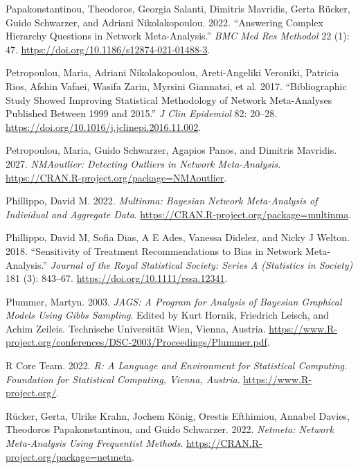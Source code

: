 \begin{CSLReferences}{1}{0}
\leavevmode{}%
Papakonstantinou, Theodoros, Georgia Salanti, Dimitris Mavridis, Gerta Rücker, Guido Schwarzer, and Adriani Nikolakopoulou. 2022. {``Answering Complex Hierarchy Questions in Network Meta-Analysis.''} \emph{BMC Med Res Methodol} 22 (1): 47. \url{https://doi.org/10.1186/s12874-021-01488-3}.

\leavevmode{}%
Petropoulou, Maria, Adriani Nikolakopoulou, Areti-Angeliki Veroniki, Patricia Rios, Afshin Vafaei, Wasifa Zarin, Myrsini Giannatsi, et al. 2017. {``Bibliographic Study Showed Improving Statistical Methodology of Network Meta-Analyses Published Between 1999 and 2015.''} \emph{J Clin Epidemiol} 82: 20--28. \url{https://doi.org/10.1016/j.jclinepi.2016.11.002}.

\leavevmode{}%
Petropoulou, Maria, Guido Schwarzer, Agapios Panos, and Dimitris Mavridis. 2027. \emph{NMAoutlier: Detecting Outliers in Network Meta-Analysis}. \url{https://CRAN.R-project.org/package=NMAoutlier}.

\leavevmode{}%
Phillippo, David M. 2022. \emph{Multinma: Bayesian Network Meta-Analysis of Individual and Aggregate Data}. \url{https://CRAN.R-project.org/package=multinma}.

\leavevmode{}%
Phillippo, David M, Sofia Dias, A E Ades, Vanessa Didelez, and Nicky J Welton. 2018. {``Sensitivity of Treatment Recommendations to Bias in Network Meta-Analysis.''} \emph{Journal of the Royal Statistical Society: Series A (Statistics in Society)} 181 (3): 843--67. \url{https://doi.org/10.1111/rssa.12341}.

\leavevmode{}%
Plummer, Martyn. 2003. \emph{JAGS: A Program for Analysis of Bayesian Graphical Models Using Gibbs Sampling}. Edited by Kurt Hornik, Friedrich Leisch, and Achim Zeileis. Technische Universität Wien, Vienna, Austria. \url{https://www.R-project.org/conferences/DSC-2003/Proceedings/Plummer.pdf}.

\leavevmode{}%
R Core Team. 2022. \emph{{R: A Language and Environment for Statistical Computing}. Foundation for Statistical Computing, Vienna, Austria}. \url{https://www.R-project.org/}.

\leavevmode{}%
Rücker, Gerta, Ulrike Krahn, Jochem König, Orestis Efthimiou, Annabel Davies, Theodoros Papakonstantinou, and Guido Schwarzer. 2022. \emph{Netmeta: Network Meta-Analysis Using Frequentist Methods}. \url{https://CRAN.R-project.org/package=netmeta}.


\end{CSLReferences}

